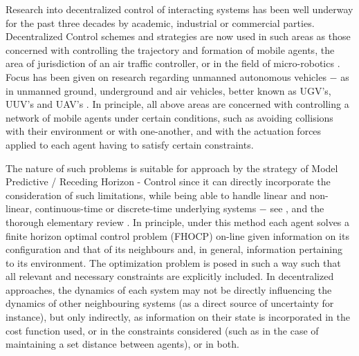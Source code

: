 Research into decentralized control of interacting systems has been well
underway for the past three decades by academic, industrial or commercial
parties. Decentralized Control schemes and strategies are now used in such areas
as those concerned with controlling the trajectory and formation of mobile
agents, the area of jurisdiction of an air traffic controller\cite{4459797}, or
in the field of micro-robotics \cite{iswarm}\cite{micron}. Focus has been given
on research regarding unmanned autonomous vehicles $-$ as in unmanned ground,
underground and air vehicles, better known as UGV's, UUV's and
UAV's \cite{1429425}\cite{Dunbar2006549}\cite{4389042}\cite{1470732}.
In principle, all above areas are concerned with controlling a network of
mobile agents under certain conditions, such as avoiding collisions with their
environment or with one-another, and with the actuation forces applied to each
agent having to satisfy certain constraints.

The nature of such problems is suitable for approach by the strategy of
Model Predictive / Receding Horizon - Control since it can directly incorporate
the consideration of such limitations, while being able to handle linear and
non-linear, continuous-time or discrete-time underlying systems $-$ see
\cite{FINDEISEN2003190}\cite{262032}\cite{grune2016nonlinear}, and the thorough
elementary review \cite{Mayne2000789}. In principle, under this method each
agent solves a finite horizon optimal control problem (FHOCP) on-line given
information on its configuration and that of its neighbours and, in general,
information pertaining to its environment. The optimization problem is posed in
such a way such that all relevant and necessary constraints are explicitly
included. In decentralized approaches, the dynamics of each system may not be
directly influencing the dynamics of other neighbouring systems (as a direct
source of uncertainty for instance), but only indirectly, as information on
their state is incorporated in the cost function used, or in the constraints
considered (such as in the case of maintaining a set distance between agents),
or in both.

